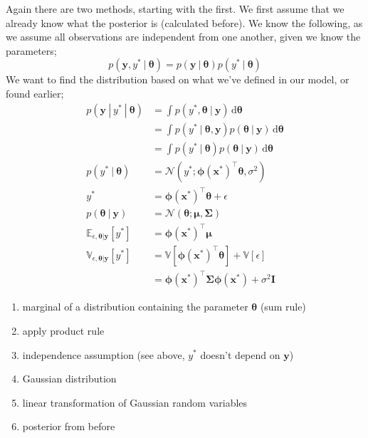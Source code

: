 \documentclass[a4paper, 12pt]{article}
\newcommand{\indefint}[2]{\int #1 \, \mathrm{d}#2}
\newcommand{\mat}[1]{\boldsymbol{#1}}
\renewcommand{\vec}[1]{\boldsymbol{#1}}
\begin{document}
            Again there are two methods, starting with the first.
            We first assume that we already know what the posterior is (calculated before).
            We know the following, as we assume all observations are independent from one another, given we know the parameters;
            $$p(\vec{y}, y^*\ |\ \vec{\theta}) = p(\vec{y}\ |\ \vec{\theta})p(y^*\ |\ \vec{\theta})$$
            We want to find the distribution based on what we've defined in our model, or found earlier;
            \setcounter{equation}{0}
            \begin{align}
                p(\vec{y}\ |\ y^*\ |\ \vec{\theta}) & = \indefint{p(y^*, \vec{\theta}\ |\ \vec{y})}{\vec{\theta}} \\
                & = \indefint{p(y^*\ |\ \vec{\theta}, \vec{y})p(\vec{\theta}\ |\ \vec{y})}{\vec{\theta}} \\
                & = \indefint{p(y^*\ |\ \vec{\theta})p(\vec{\theta}\ |\ \vec{y})}{\vec{\theta}} \\
                p(y^*\ |\ \vec{\theta}) & = \mathcal{N}(y^*; \vec{\phi}(\vec{x^*})^\top\vec{\theta}, \sigma^2) \\
                y^* & = \vec{\phi}(\vec{x^*})^\top\vec{\theta} + \epsilon \\
                p(\vec{\theta}\ |\ \vec{y}) & = \mathcal{N}(\vec{\theta}; \vec{\mu}, \mat{\Sigma}) \\
                \mathbb{E}_{\epsilon, \vec{\theta} | \vec{y}}[y^*] & = \vec{\phi}(\vec{x^*})^\top \vec{\mu} \\
                \mathbb{V}_{\epsilon, \vec{\theta} | \vec{y}}[y^*] & = \mathbb{V}[\vec{\phi}(\vec{x^*})^\top\vec{\theta}] + \mathbb{V}[\epsilon] \\
                & = \vec{\phi}(\vec{x^*})^\top \mat{\Sigma} \vec{\phi}(\vec{x^*}) + \sigma^2 \mat{I}
            \end{align}
            \begin{enumerate}[(1)]
                \itemsep0em
                \item marginal of a distribution containing the parameter $\vec{\theta}$ (sum rule)
                \item apply product rule
                \item independence assumption (see above, $y^*$ doesn't depend on $\vec{y}$)
                \item Gaussian distribution
                \item linear transformation of Gaussian random variables
                \item posterior from before
            \end{enumerate}
\end{document}
